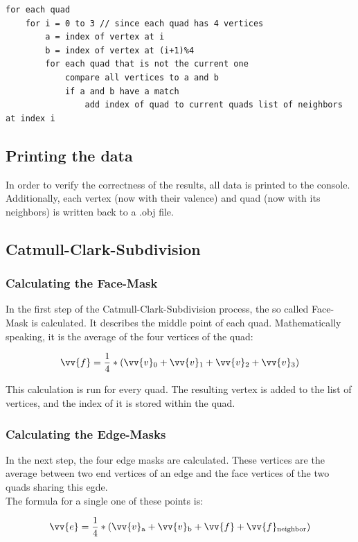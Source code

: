 \documentclass[12pt,a4paper]{scrartcl}
\begin{document}
\begin{lstlisting}[language=PSEUDO]
for each quad
	for i = 0 to 3 // since each quad has 4 vertices
		a = index of vertex at i
		b = index of vertex at (i+1)%4
		for each quad that is not the current one
			compare all vertices to a and b
			if a and b have a match
				add index of quad to current quads list of neighbors at index i 
\end{lstlisting} 

\subsection{Printing the data}
In order to verify the correctness of the results, all data is printed to the console. Additionally, each vertex (now with their valence) and quad (now with its neighbors) is written back to a .obj file.

\subsection{Catmull-Clark-Subdivision}

\subsubsection{Calculating the Face-Mask}
In the first step of the Catmull-Clark-Subdivision process, the so called Face-Mask is calculated. It describes the middle point of each quad. Mathematically speaking, it is the average of the four vertices of the quad:

$$ \vv{f} = \frac{1}{4}*( \vv{v}\textsubscript{0} + \vv{v}\textsubscript{1} + \vv{v}\textsubscript{2} + \vv{v}\textsubscript{3}) $$

This calculation is run for every quad. The resulting vertex is added to the list of vertices, and the index of it is stored within the quad.

\subsubsection{Calculating the Edge-Masks}
In the next step, the four edge masks are calculated. These vertices are the average between two end vertices of an edge and the face vertices of the two quads sharing this egde.\\
The formula for a single one of these points is:

$$ \vv{e} = \frac{1}{4} * (\vv{v}\textsubscript{a} + \vv{v}\textsubscript{b} + \vv{f} + \vv{f}\textsubscript{neighbor}) $$
\end{document}
